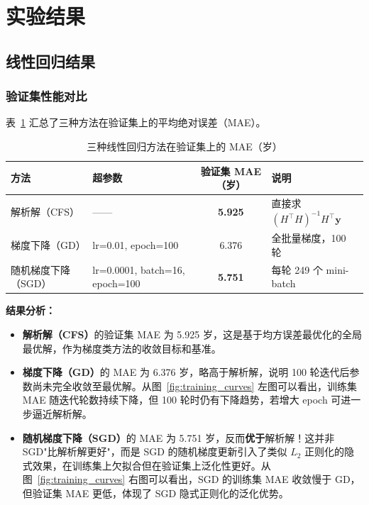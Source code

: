 \documentclass[12pt,a4paper]{ctexart}
\begin{document}
\section{实验结果}

\subsection{线性回归结果}

\subsubsection{验证集性能对比}

表~\ref{tab:mae} 汇总了三种方法在验证集上的平均绝对误差（MAE）。

\begin{table}[H]
\centering
\caption{三种线性回归方法在验证集上的 MAE（岁）}
\label{tab:mae}
\small
\begin{tabular}{lp{5cm}cp{3.8cm}}
\toprule
方法 & 超参数 & 验证集 MAE（岁）& 说明 \\
\midrule
解析解（CFS）  & ——                                  & \textbf{5.925} & 直接求 $(H^\top H)^{-1} H^\top \mathbf{y}$ \\[4pt]
梯度下降（GD） & lr=0.01, epoch=100                  & 6.376          & 全批量梯度，100 轮 \\[4pt]
随机梯度下降（SGD） & lr=0.0001, batch=16, epoch=100 & \textbf{5.751} & 每轮 249 个 mini-batch \\
\bottomrule
\end{tabular}
\end{table}

\textbf{结果分析：}

\begin{itemize}
  \item \textbf{解析解（CFS）}的验证集 MAE 为 5.925 岁，这是基于均方误差最优化的全局最优解，作为梯度类方法的收敛目标和基准。
  \item \textbf{梯度下降（GD）}的 MAE 为 6.376 岁，略高于解析解，说明 100 轮迭代后参数尚未完全收敛至最优解。从图~\ref{fig:training_curves} 左图可以看出，训练集 MAE 随迭代轮数持续下降，但 100 轮时仍有下降趋势，若增大 epoch 可进一步逼近解析解。
  \item \textbf{随机梯度下降（SGD）}的 MAE 为 5.751 岁，反而\textbf{优于}解析解！这并非 SGD"比解析解更好"，而是 SGD 的随机梯度更新引入了类似 $L_2$ 正则化的隐式效果，在训练集上欠拟合但在验证集上泛化性更好。从图~\ref{fig:training_curves} 右图可以看出，SGD 的训练集 MAE 收敛慢于 GD，但验证集 MAE 更低，体现了 SGD 隐式正则化的泛化优势。
\end{itemize}
\end{document}
